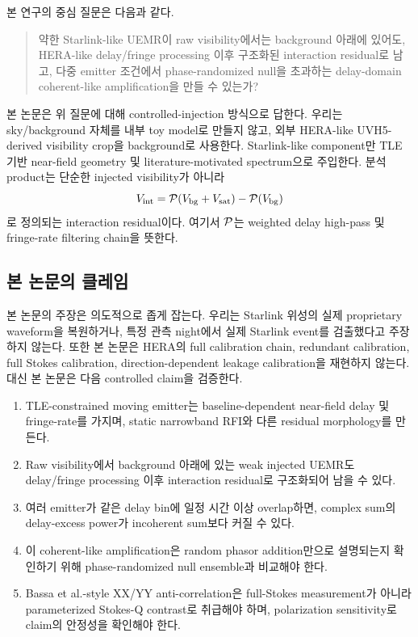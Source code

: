 \documentclass[11pt,a4paper]{article}
\newcommand{\vis}{V}
\begin{document}
본 연구의 중심 질문은 다음과 같다.

\begin{quote}
약한 Starlink-like UEMR이 raw visibility에서는 background 아래에 있어도, HERA-like delay/fringe processing 이후 구조화된 interaction residual로 남고, 다중 emitter 조건에서 phase-randomized null을 초과하는 delay-domain coherent-like amplification을 만들 수 있는가?
\end{quote}

본 논문은 위 질문에 대해 controlled-injection 방식으로 답한다.
우리는 sky/background 자체를 내부 toy model로 만들지 않고, 외부 HERA-like UVH5-derived visibility crop을 background로 사용한다.
Starlink-like component만 TLE 기반 near-field geometry 및 literature-motivated spectrum으로 주입한다.
분석 product는 단순한 injected visibility가 아니라
\begin{equation}
  \vis_{\rm int}
  =
  {\cal P}(\vis_{\rm bg}+\vis_{\rm sat})
  -
  {\cal P}(\vis_{\rm bg})
\end{equation}
로 정의되는 interaction residual이다.
여기서 ${\cal P}$는 weighted delay high-pass 및 fringe-rate filtering chain을 뜻한다.

\subsection{본 논문의 클레임}

본 논문의 주장은 의도적으로 좁게 잡는다.
우리는 Starlink 위성의 실제 proprietary waveform을 복원하거나, 특정 관측 night에서 실제 Starlink event를 검출했다고 주장하지 않는다.
또한 본 논문은 HERA의 full calibration chain, redundant calibration, full Stokes calibration, direction-dependent leakage calibration을 재현하지 않는다.
대신 본 논문은 다음 controlled claim을 검증한다.

\begin{enumerate}
  \item TLE-constrained moving emitter는 baseline-dependent near-field delay 및 fringe-rate를 가지며, static narrowband RFI와 다른 residual morphology를 만든다.
  \item Raw visibility에서 background 아래에 있는 weak injected UEMR도 delay/fringe processing 이후 interaction residual로 구조화되어 남을 수 있다.
  \item 여러 emitter가 같은 delay bin에 일정 시간 이상 overlap하면, complex sum의 delay-excess power가 incoherent sum보다 커질 수 있다.
  \item 이 coherent-like amplification은 random phasor addition만으로 설명되는지 확인하기 위해 phase-randomized null ensemble과 비교해야 한다.
  \item Bassa et al.-style XX/YY anti-correlation은 full-Stokes measurement가 아니라 parameterized Stokes-Q contrast로 취급해야 하며, polarization sensitivity로 claim의 안정성을 확인해야 한다.
\end{enumerate}
\end{document}
